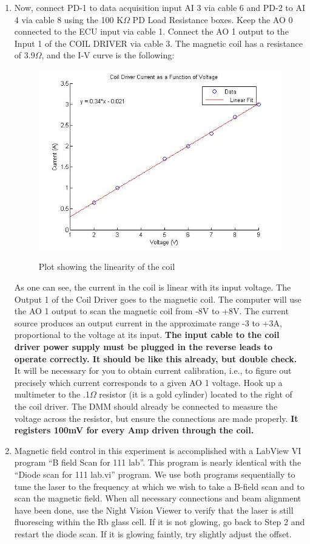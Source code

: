 \documentclass{../lab}
\begin{document}
\begin{enumerate}
    \item Now, connect PD-1 to data acquisition input AI 3 via cable 6 and PD-2 to AI 4 via cable 8 using the 100 K$\Omega$ PD Load Resistance boxes. Keep the AO 0 connected to the ECU input via cable 1. Connect the AO 1 output to the Input 1 of the COIL DRIVER via cable 3. The magnetic coil has a resistance of 3.9$\Omega$, and the I-V curve is the following:
    \begin{figure}[h]
        \centering
        \href{http://experimentationlab.berkeley.edu/sites/default/files/images/Voltagecurrentplot.jpg}{\includegraphics[width=0.5\linewidth]{images/Voltagecurrentplot.jpg}}
        \caption{Plot showing the linearity of the coil}
        \label{fig:Voltagecurrentplot}
    \end{figure}
    
    As one can see, the current in the coil is linear with its input voltage. The Output 1 of the Coil Driver goes to the magnetic coil. The computer will use the AO 1 output to scan the magnetic coil from -8V to +8V. The current source produces an output current in the approximate range -3 to +3A, proportional to the voltage at its input. \textbf{The input cable to the coil driver power supply must be plugged in the reverse leads to operate correctly. It should be like this already, but double check.} It will be necessary for you to obtain current calibration, i.e., to figure out precisely which current corresponds to a given AO 1 voltage. Hook up a multimeter to the .1$\Omega$ resistor (it is a gold cylinder) located to the right of the coil driver. The DMM should already be connected to measure the voltage across the resistor, but ensure the connections are made properly. \textbf{It registers 100mV for every Amp driven through the coil.}

\newpage

    \item Magnetic field control in this experiment is accomplished with a LabView VI program ``B field Scan for 111 lab''. This program is nearly identical with the ``Diode scan for 111 lab.vi'' program. We use both programs sequentially to tune the laser to the frequency at which we wish to take a B-field scan and to scan the magnetic field. When all necessary connections and beam alignment have been done, use the Night Vision Viewer to verify that the laser is still fluorescing within the Rb glass cell. If it is not glowing, go back to Step 2 and restart the diode scan. If it is glowing faintly, try slightly adjust the offset.
    

\end{enumerate}
\end{document}
